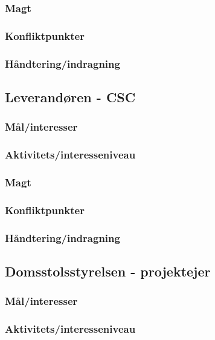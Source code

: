 \documentclass[10pt,a4paper,danish]{article}
\begin{document}
\subsubsection{Magt}

\subsubsection{Konfliktpunkter}

\subsubsection{Håndtering/indragning}

\subsection{Leverandøren - CSC}
\subsubsection{Mål/interesser}

\subsubsection{Aktivitets/interesseniveau}

\subsubsection{Magt}

\subsubsection{Konfliktpunkter}

\subsubsection{Håndtering/indragning}

\subsection{Domsstolsstyrelsen - projektejer}
\subsubsection{Mål/interesser}

\subsubsection{Aktivitets/interesseniveau}
\end{document}
